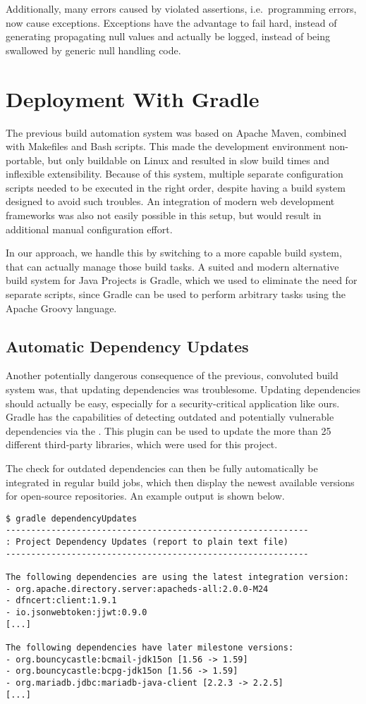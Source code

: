 Additionally, many errors caused by violated assertions, i.e.\ programming errors, now cause exceptions.
Exceptions have the advantage to fail hard, instead of generating propagating null values and actually be logged,
instead of being swallowed by generic null handling code.

\section{Deployment With Gradle}\label{sec:deploymentWithGradle}
The previous build automation system was based on Apache Maven, combined with Makefiles and Bash scripts.
This made the development environment non-portable, but only buildable on Linux and resulted in slow build times and
inflexible extensibility.
Because of this system, multiple separate configuration scripts needed to be executed in the right order, despite having
a build system designed to avoid such troubles.
An integration of modern web development frameworks was also not easily possible in this setup, but would result in
additional manual configuration effort.

In our approach, we handle this by switching to a more capable build system, that can actually manage those build tasks.
A suited and modern alternative build system for Java Projects is Gradle, which we used to eliminate the need for
separate scripts, since Gradle can be used to perform arbitrary tasks using the Apache Groovy language.

\subsection*{Automatic Dependency Updates}
Another potentially dangerous consequence of the previous, convoluted build system was, that updating dependencies was
troublesome.
Updating dependencies should actually be easy, especially for a security-critical application like ours.
Gradle has the capabilities of detecting outdated and potentially vulnerable dependencies via the
.
This plugin can be used to update the more than 25 different third-party libraries, which were used for this project.

The check for outdated dependencies can then be fully automatically be integrated in regular build jobs, which then
display the newest available versions for open-source repositories.
An example output is shown below.

\begin{lstlisting}
$ gradle dependencyUpdates
------------------------------------------------------------
: Project Dependency Updates (report to plain text file)
------------------------------------------------------------

The following dependencies are using the latest integration version:
- org.apache.directory.server:apacheds-all:2.0.0-M24
- dfncert:client:1.9.1
- io.jsonwebtoken:jjwt:0.9.0
[...]

The following dependencies have later milestone versions:
- org.bouncycastle:bcmail-jdk15on [1.56 -> 1.59]
- org.bouncycastle:bcpg-jdk15on [1.56 -> 1.59]
- org.mariadb.jdbc:mariadb-java-client [2.2.3 -> 2.2.5]
[...]
\end{lstlisting}

